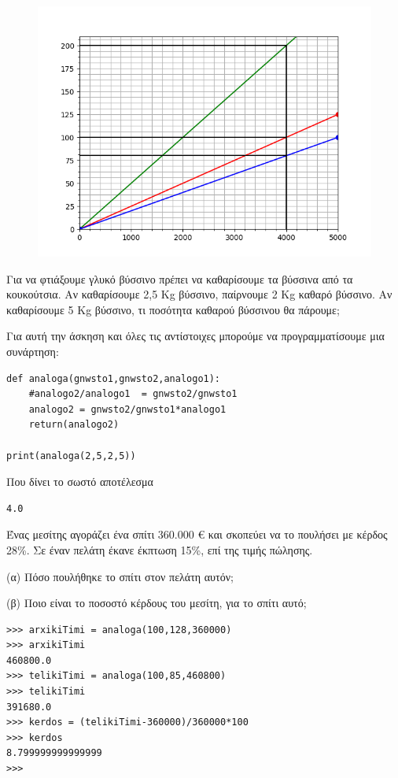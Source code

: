 \begin{figure}
\includegraphics{sel101_4a.png}
\end{figure}
\begin{exercise}
Για	να	φτιάξουμε	γλυκό	βύσσινο	πρέπει	να	καθαρίσουμε	τα	βύσσινα	από	τα	κουκούτσια.	Αν	καθαρίσουμε	2,5	Kg	βύσσινο,	παίρνουμε	2	Kg	καθαρό	βύσσινο. Αν	καθαρίσουμε	5	Kg	βύσσινο,	τι	ποσότητα	καθαρού	βύσσινου	θα	πάρουμε; 
\end{exercise}
Για αυτή την άσκηση και όλες τις αντίστοιχες μπορούμε να προγραμματίσουμε μια συνάρτηση:
\begin{lstlisting}
def analoga(gnwsto1,gnwsto2,analogo1):
    #analogo2/analogo1  = gnwsto2/gnwsto1
    analogo2 = gnwsto2/gnwsto1*analogo1
    return(analogo2)

print(analoga(2,5,2,5))
\end{lstlisting}
Που δίνει το σωστό αποτέλεσμα
\begin{lstlisting}
4.0
\end{lstlisting}
\begin{exercise}
Ένας	μεσίτης	αγοράζει	ένα	σπίτι	360.000	€	και	σκοπεύει	να	το	πουλήσει	με	κέρδος	28\%.	Σε	έναν	πελάτη	έκανε	έκπτωση	15\%,	επί	της	τιμής	πώλησης. 

(α)		Πόσο	πουλήθηκε	το	σπίτι	στον	πελάτη	αυτόν; 

(β)		Ποιο	είναι	το	ποσοστό	κέρδους	του	μεσίτη,	για	το		σπίτι	αυτό; 
\end{exercise}
\begin{lstlisting}
>>> arxikiTimi = analoga(100,128,360000)
>>> arxikiTimi
460800.0
>>> telikiTimi = analoga(100,85,460800)
>>> telikiTimi
391680.0
>>> kerdos = (telikiTimi-360000)/360000*100
>>> kerdos
8.799999999999999
>>> 
\end{lstlisting}
